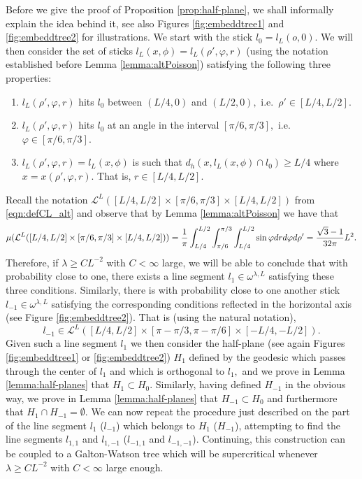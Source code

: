 \documentclass[10pt,a4paper]{amsart}
\newcommand{\CL}{{\mathcal{L}}}
\newcommand{\dd}{{\rm d}}
\begin{document}
Before we give the proof of Proposition \ref{prop:half-plane}, we shall informally explain the idea behind 
it, see also Figures  \ref{fig:embeddtree1} and \ref{fig:embeddtree2} for 
illustrations. 
We start with the stick $l_0=l_L(o,0)$. We will then consider 
the set of sticks $l_L(x,\phi)=l_L(\rho',\varphi,r)$ (using the notation established
before Lemma \ref{lemma:altPoisson}) satisfying the following 
three properties:
\begin{enumerate}
    \item $l_L(\rho',\varphi,r)$ hits $l_0$ between $(L/4,0)$ and $(L/2,0),$ 
    i.e.\ $\rho'\in[L/4,L/2].$

    \item $l_L(\rho',\varphi,r)$ hits $l_0$ at an angle in the interval 
    $[\pi/6,\pi/3],$ i.e.\  $\varphi\in[\pi/6,\pi/3].$

    \item $l_L(\rho',\varphi,r)=l_L(x,\phi)$ is such that $d_h(x,l_L(x,\phi)\cap l_0)\geq L/4$
    where $x=x(\rho',\varphi,r).$ That is, $r\in[L/4,L/2].$ 
\end{enumerate} 
Recall the notation  $\CL^L([L/4,L/2]\times[\pi/6,\pi/3]\times[L/4,L/2])$ from
\eqref{eqn:defCL_alt} and observe that by Lemma \ref{lemma:altPoisson} we have that 
\begin{equation}\label{eqn:muofsticks}
\mu(\CL^L([L/4,L/2]\times[\pi/6,\pi/3]\times[L/4,L/2])) 
=\frac{1}{\pi}\int_{L/4}^{L/2} \int_{\pi/6}^{\pi/3} \int_{L/4}^{L/2} 
\sin \varphi  \dd r  \dd \varphi \dd \rho'
=\frac{\sqrt{3}-1}{32\pi }L^2. 
\end{equation} 
Therefore, if $\lambda\geq C L^{-2}$ with $C<\infty$ large, we will be able 
to conclude that with probability close to one, there exists a line 
segment $l_1\in \omega^{\lambda,L}$ satisfying 
these three conditions. 
Similarly, there is with probability close to one another stick
$l_{-1}\in \omega^{\lambda,L}$ satisfying the corresponding conditions 
reflected in 
the horizontal axis (see Figure \ref{fig:embeddtree2}). That is (using 
the natural notation),
\[
l_{-1}\in \CL^L([L/4,L/2]\times[\pi-\pi/3,\pi-\pi/6]\times[-L/4,-L/2]).
\]
Given such a line segment $l_1$ we then consider the half-plane (see again Figures
\ref{fig:embeddtree1} or \ref{fig:embeddtree2}) $H_1$ defined by the geodesic 
which passes through the center of $l_1$ and which is orthogonal 
to $l_1,$ and 
we prove in Lemma \ref{lemma:half-planes}
that $H_1 \subset H_0.$ Similarly, having defined $H_{-1}$ in the obvious way, we 
prove in Lemma \ref{lemma:half-planes}
that $H_{-1}\subset H_0$ and furthermore that $H_1 \cap H_{-1}=\emptyset.$
We can now repeat the procedure just described on the part of the line 
segment $l_1$ ($l_{-1}$) which belongs to $H_1$ ($H_{-1}$), attempting to 
find the line segments $l_{1,1}$ and $l_{1,-1}$ ($l_{-1,1}$ and $l_{-1,-1}$).
Continuing, this construction can be coupled to a Galton-Watson tree which will be 
supercritical whenever $\lambda\geq C L^{-2}$ with $C<\infty$ large enough.
\end{document}
